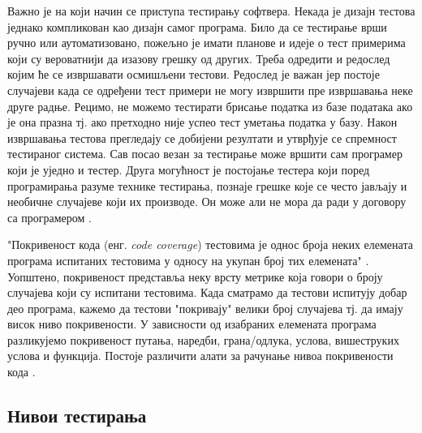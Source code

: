 \documentclass[12pt,oneside]{memoir}
\begin{document}
Важно је на који начин се приступа тестирању софтвера. Некада је дизајн тестова једнако компликован као дизајн самог програма. Било да се тестирање врши ручно или аутоматизовано, пожељно је имати планове и идеје о тест примерима који су вероватнији да изазову грешку од других. Треба одредити и редослед којим ће се извршавати осмишљени тестови. Редослед је важан јер постоје случајеви када се одређени тест примери не могу извршити пре извршавања неке друге радње. Рецимо, не можемо тестирати брисање податка из базе података ако је она празна тј. ако претходно није успео тест уметања податка у базу. Након извршавања тестова прегледају се добијени резултати и утврђује се спремност тестираног система. Сав посао везан за тестирање може вршити сам програмер који је уједно и тестер. Друга могућност је постојање тестера који поред програмирања разуме технике тестирања, познаје грешке које се често јављају и необичне случајеве који их производе. Он може али не мора да ради у договору са програмером \cite{guideTestDesign, testMilena}.

"Покривеност кода (енг. \textit{code coverage}) тестовима је однос броја неких елемената програма испитаних тестовима у односу на укупан број тих елемената" \cite{testMilena}. Уопштено, покривеност представља неку врсту метрике која говори о броју случајева који су испитани тестовима. Када сматрамо да тестови испитују добар део програма, кажемо да тестови "покривају" велики број случајева тј. да имају висок ниво покривености. У зависности од изабраних елемената програма разликујемо покривеност путања, наредби, грана/одлука, услова, вишеструких услова и функција. Постоје различити алати за рачунање нивоа покривености кода \cite{testMilena}.
\subsection{Нивои тестирања}
\label{subsec:nivoiTest}
\end{document}
